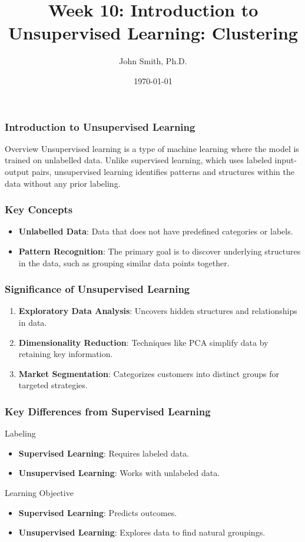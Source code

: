 \documentclass[aspectratio=169]{beamer}
\title[Unsupervised Learning]{Week 10: Introduction to Unsupervised Learning: Clustering}
\author[J. Smith]{John Smith, Ph.D.}
\institute[University Name]{
  Department of Computer Science\\
  University Name\\
  \vspace{0.3cm}
  Email: email@university.edu\\
  Website: www.university.edu
}
\date{\today}
\begin{document}
\frame{\titlepage}

\begin{frame}[fragile]
    \frametitle{Introduction to Unsupervised Learning}
    \begin{block}{Overview}
        Unsupervised learning is a type of machine learning where the model is trained on unlabelled data. Unlike supervised learning, which uses labeled input-output pairs, unsupervised learning identifies patterns and structures within the data without any prior labeling.
    \end{block}
\end{frame}

\begin{frame}[fragile]
    \frametitle{Key Concepts}
    \begin{itemize}
        \item \textbf{Unlabelled Data}: Data that does not have predefined categories or labels. 
        \item \textbf{Pattern Recognition}: The primary goal is to discover underlying structures in the data, such as grouping similar data points together.
    \end{itemize}
\end{frame}

\begin{frame}[fragile]
    \frametitle{Significance of Unsupervised Learning}
    \begin{enumerate}
        \item \textbf{Exploratory Data Analysis}: Uncovers hidden structures and relationships in data.
        \item \textbf{Dimensionality Reduction}: Techniques like PCA simplify data by retaining key information.
        \item \textbf{Market Segmentation}: Categorizes customers into distinct groups for targeted strategies.
    \end{enumerate}
\end{frame}

\begin{frame}[fragile]
    \frametitle{Key Differences from Supervised Learning}
    \begin{block}{Labeling}
        \begin{itemize}
            \item \textbf{Supervised Learning}: Requires labeled data.
            \item \textbf{Unsupervised Learning}: Works with unlabeled data.
        \end{itemize}
    \end{block}
    \begin{block}{Learning Objective}
        \begin{itemize}
            \item \textbf{Supervised Learning}: Predicts outcomes.
            \item \textbf{Unsupervised Learning}: Explores data to find natural groupings.
        \end{itemize}
    \end{block}
\end{frame}
\end{document}
